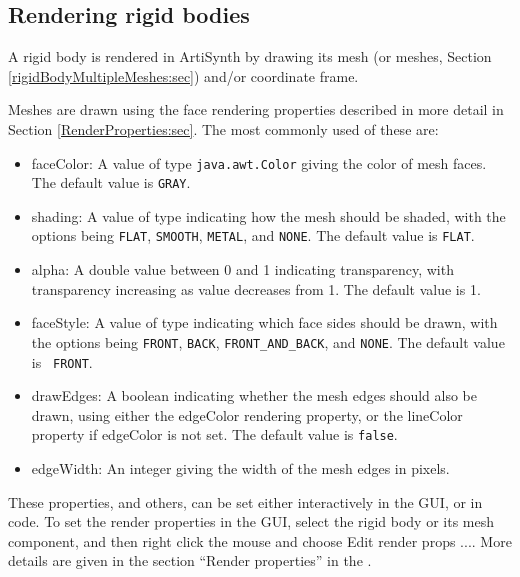 \subsection{Rendering rigid bodies}
\label{rigidBodyRendering:sec}

A rigid body is rendered in ArtiSynth by drawing its mesh (or meshes,
Section \ref{rigidBodyMultipleMeshes:sec}) and/or coordinate frame.

Meshes are drawn using the face rendering properties described in more
detail in Section \ref{RenderProperties:sec}. The most commonly used
of these are:

\begin{itemize}

\item {\sf faceColor}: A value of type {\tt java.awt.Color} giving the
color of mesh faces. The default value is {\tt GRAY}.

\item {\sf shading}: A value of type
 indicating how the mesh
should be shaded, with the options being {\tt FLAT}, {\tt SMOOTH},
{\tt METAL}, and {\tt NONE}.  The default value is {\tt FLAT}.

\item {\sf alpha}: A double value between 0 and 1 indicating
transparency, with transparency increasing as value decreases from 1.
The default value is 1.

\item {\sf faceStyle}: A value of type
 indicating which face
sides should be drawn, with the options being {\tt FRONT}, {\tt BACK},
{\tt FRONT\_AND\_BACK}, and {\tt NONE}.  The default value is {\tt
FRONT}.

\item {\sf drawEdges}: A boolean indicating whether the mesh edges
should also be drawn, using either the {\sf edgeColor} rendering
property, or the {\sf lineColor} property if {\sf edgeColor} is not
set. The default value is {\tt false}.

\item {\sf edgeWidth}: An integer giving the width of the mesh
edges in pixels.

\end{itemize}

These properties, and others, can be set either interactively in the
GUI, or in code. To set the render properties in the GUI, select the
rigid body or its mesh component, and then right click the mouse and
choose {\sf Edit render props ...}. More details are given in the
section ``Render properties'' in the .

